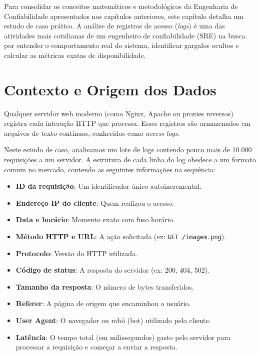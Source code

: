 \documentclass[12pt,a4paper,twoside]{report}
\begin{document}
Para consolidar os conceitos matemáticos e metodológicos da Engenharia de Confiabilidade apresentados nos capítulos anteriores, este capítulo detalha um estudo de caso prático. A análise de registros de acesso (\textit{logs}) é uma das atividades mais cotidianas de um engenheiro de confiabilidade (SRE) na busca por entender o comportamento real do sistema, identificar gargalos ocultos e calcular as métricas exatas de disponibilidade.

\section{Contexto e Origem dos Dados}

Qualquer servidor web moderno (como Nginx, Apache ou proxies reversos) registra cada interação HTTP que processa. Esses registros são armazenados em arquivos de texto contínuos, conhecidos como \textit{access logs}. 

Neste estudo de caso, analisamos um lote de logs contendo pouco mais de 10.000 requisições a um servidor. A estrutura de cada linha do log obedece a um formato comum no mercado, contendo as seguintes informações na sequência:

\begin{itemize}[nosep]
    \item \textbf{ID da requisição}: Um identificador único autoincremental.
    \item \textbf{Endereço IP do cliente}: Quem realizou o acesso.
    \item \textbf{Data e horário}: Momento exato com fuso horário.
    \item \textbf{Método HTTP e URL}: A ação solicitada (ex: \texttt{GET /imagem.png}).
    \item \textbf{Protocolo}: Versão do HTTP utilizada.
    \item \textbf{Código de status}: A resposta do servidor (ex: 200, 404, 502).
    \item \textbf{Tamanho da resposta}: O número de bytes transferidos.
    \item \textbf{Referer}: A página de origem que encaminhou o usuário.
    \item \textbf{User Agent}: O navegador ou robô (bot) utilizado pelo cliente.
    \item \textbf{Latência}: O tempo total (em milissegundos) gasto pelo servidor para processar a requisição e começar a enviar a resposta.
\end{itemize}
\end{document}
